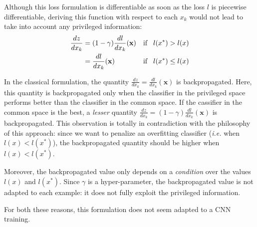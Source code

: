 {\color{red}Although this loss formulation is differentiable as soon as the loss $l$ is piecewise differentiable, deriving this function with respect to each $x_k$ would not lead to take into account any privileged information: 
\begin{align}
 \frac{dz}{dx_k} &= (1-\gamma) \frac{dl}{dx_k}(\mathbf{x})  &  \text{if}& \hspace{0.3cm} l(x^*) > l(x) \nonumber \\
                 &= \frac{dl}{dx_k}(\mathbf{x})             &  \text{if}& \hspace{0.3cm} l(x^*) \leq l(x) \nonumber
\end{align}

In the classical formulation, the quantity $\frac{dz}{dx_k} = \frac{dl}{dx_k}(\mathbf{x})$ is backpropagated.
Here, this quantity is backpropagated only when the classifier in the privileged space performs better than the classifier in the common space. 
If the cassifier in the common space is the best, a \textit{lesser} quantity $\frac{dz}{dx_k} = (1-\gamma) \frac{dl}{dx_k}(\mathbf{x})$ is backpropagated.
This observation is totally in contradiction with the philosophy of this approach: since we want to penalize an overfitting classifier (\textit{i.e.} when $l(x) < l(x^*)$), the backpropagated quantity should be higher when $l(x) < l(x^*)$.

Moreover, the backpropagated value only depends on a \textit{condition} over the values $l(x)$ and $l(x^*)$. Since $\gamma$ is a hyper-parameter, the backpropagated value is not adapted to each example: it does not fully exploit the privileged information. 

For both these reasons, this formulation does not seem adapted to a CNN training. 
} 









